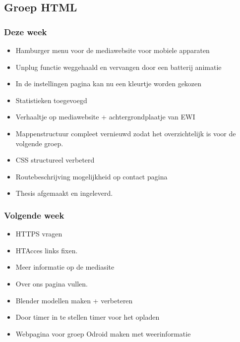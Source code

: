 \subsection*{Groep HTML}
\subsubsection*{Deze week}
\begin{itemize}
\item Hamburger menu voor de mediawebsite voor mobiele apparaten
\item Unplug functie weggehaald en vervangen door een batterij animatie
\item In de instellingen pagina kan nu een kleurtje worden gekozen
\item Statistieken toegevoegd
\item Verhaaltje op mediawebsite + achtergrondplaatje van EWI
\item Mappenstructuur compleet vernieuwd zodat het overzichtelijk is voor de volgende groep.
\item CSS structureel verbeterd
\item Routebeschrijving mogelijkheid op contact pagina
\item Thesis afgemaakt en ingeleverd.


\end{itemize}

\subsubsection*{Volgende week}
\begin{itemize}
\item HTTPS vragen
\item HTAcces links fixen.
\item Meer informatie op de mediasite
\item Over ons pagina vullen.
\item Blender modellen maken + verbeteren
\item Door timer in te stellen timer voor het opladen
\item Webpagina voor groep Odroid maken met weerinformatie
\end{itemize}
